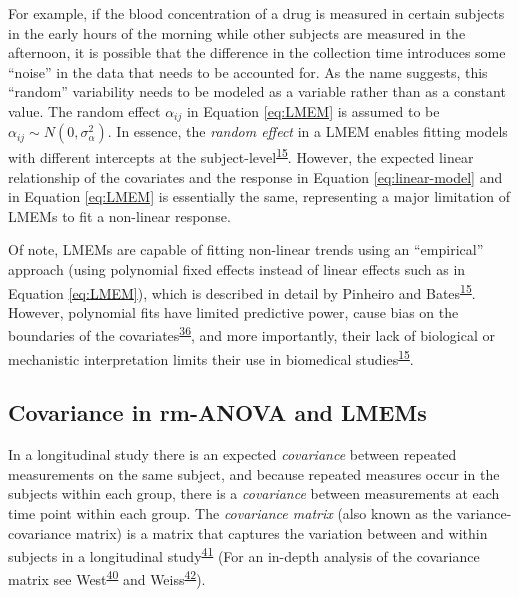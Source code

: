 \documentclass[
]{article}
\begin{document}
For example, if the blood concentration of a drug is measured in certain subjects in the early hours of the morning while other subjects are measured in the afternoon, it is possible that the difference in the collection time introduces some ``noise'' in the data that needs to be accounted for. As the name suggests, this ``random'' variability needs to be modeled as a variable rather than as a constant value. The random effect \(\alpha_{ij}\) in Equation \eqref{eq:LMEM} is assumed to be \(\alpha_{ij} \sim N(0,\sigma^2_\alpha)\). In essence, the \emph{random effect} in a LMEM enables fitting models with different intercepts at the subject-level\textsuperscript{\protect\hyperlink{ref-pinheiro2006}{15}}. However, the expected linear relationship of the covariates and the response in Equation \eqref{eq:linear-model} and in Equation \eqref{eq:LMEM} is essentially the same, representing a major limitation of LMEMs to fit a non-linear response.

Of note, LMEMs are capable of fitting non-linear trends using an ``empirical'' approach (using polynomial fixed effects instead of linear effects such as in Equation \eqref{eq:LMEM}), which is described in detail by Pinheiro and Bates\textsuperscript{\protect\hyperlink{ref-pinheiro2006}{15}}. However, polynomial fits have limited predictive power, cause bias on the boundaries of the covariates\textsuperscript{\protect\hyperlink{ref-beck1998}{36}}, and more importantly, their lack of biological or mechanistic interpretation limits their use in biomedical studies\textsuperscript{\protect\hyperlink{ref-pinheiro2006}{15}}.

\hypertarget{covariance-in-rm-anova-and-lmems}{%
\subsection{Covariance in rm-ANOVA and LMEMs}\label{covariance-in-rm-anova-and-lmems}}

In a longitudinal study there is an expected \emph{covariance} between repeated measurements on the same subject, and because repeated measures occur in the subjects within each group, there is a \emph{covariance} between measurements at each time point within each group. The \emph{covariance matrix} (also known as the variance-covariance matrix) is a matrix that captures the variation between and within subjects in a longitudinal study\textsuperscript{\protect\hyperlink{ref-wolfinger1996}{41}} (For an in-depth analysis of the covariance matrix see West\textsuperscript{\protect\hyperlink{ref-west2014}{40}} and Weiss\textsuperscript{\protect\hyperlink{ref-weiss2005}{42}}).
\end{document}
